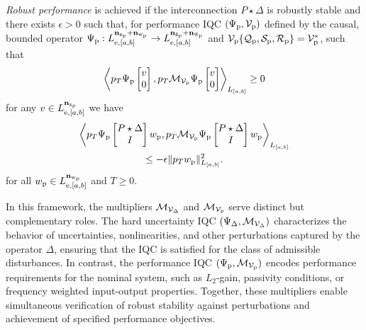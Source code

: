 \begin{definition}
\label{def:robust-performance}\emph{Robust performance} is achieved if the interconnection $P \star \Delta$
is {robustly stable} and there exists $\epsilon>0$ such that, for performance IQC
$(\Psi_{{\mathrm{p}}}, {\mathcal{V}_{{\mathrm{p}}}})$ defined by the causal, bounded operator $\Psi_{{\mathrm{p}}}:
L^{\mathbf{n}_{{\mathrm{z}}_{{\mathrm{p}}}} + \mathbf{n}_{{\mathrm{w}}_{{\mathrm{p}}}}}_{{\mathrm{e}}, [a,b]}
\to
L^{\mathbf{n}_{\tilde{{\mathrm{z}}}_{{\mathrm{p}}}} + \mathbf{n}_{\tilde{{\mathrm{w}}}_{{\mathrm{p}}}}}_{{\mathrm{e}}, [a,b]}$ and
$\mathcal{V}_{{\mathrm{p}}}\{\mathcal{Q}_{\mathrm{p}}, \mathcal{S}_{\mathrm{p}}, \mathcal{R}_{\mathrm{p}}\}=\mathcal{V}_{{\mathrm{p}}}^*$, such that
\[\left\langle p_T \Psi_{{\mathrm{p}}}\begin{bmatrix}v \\ 0\end{bmatrix}, p_T\mathcal{M}_{\mathcal{V}_{{\mathrm{p}}}}\Psi_{{\mathrm{p}}}\begin{bmatrix}v\\ 0\end{bmatrix} \right\rangle_{L_{[a,b]}}\geq 0\]
for any $v\in L_{{\mathrm{e}},[a,b]}^{\mathbf{n}_{{\mathrm{z}}_{{\mathrm{p}}}}}$ we have 
\begin{gather*}
\left\langle p_T\Psi_{{\mathrm{p}}}\begin{bmatrix}P\star\Delta\\I\end{bmatrix}w_{{\mathrm{p}}}, p_T\mathcal{M}_{\mathcal{V}_{{\mathrm{p}}}}\Psi_{{\mathrm{p}}}\begin{bmatrix}P\star\Delta\\I\end{bmatrix}w_{{\mathrm{p}}} \right\rangle_{L_{[a,b]}}
\\ \leq -\epsilon\|p_Tw_{{\mathrm{p}}}\|_{L_{[a,b]}}^2.
\end{gather*}
for all $w_{{\mathrm{p}}}\in L_{{\mathrm{e}},[a,b]}^{\mathbf{n}_{{\mathrm{w}}_{{\mathrm{p}}}}}$ and $T \geq 0$. 
\end{definition}
In this framework, the multipliers $\mathcal{M}_{\mathcal{V} _\Delta}$ and
$\mathcal{M}_{{\mathcal{V}}_{{\mathrm{p}}}}$ serve distinct but complementary roles.
The hard uncertainty IQC $(\Psi_\Delta, \mathcal{M}_{\mathcal{V}_\Delta})$ characterizes the behavior of uncertainties,
nonlinearities, and other perturbations captured by the operator $\Delta$,
ensuring that the IQC is satisfied for the class of admissible disturbances.
In contrast, the performance IQC $(\Psi_{{\mathrm{p}}}, \mathcal{M}_{\mathcal{V}_{{\mathrm{p}}}})$ encodes performance
requirements for the nominal system, such as $L_2$-gain, passivity
conditions, or frequency weighted input-output properties.
Together, these multipliers enable simultaneous verification of robust stability
against perturbations and achievement of specified performance objectives.

